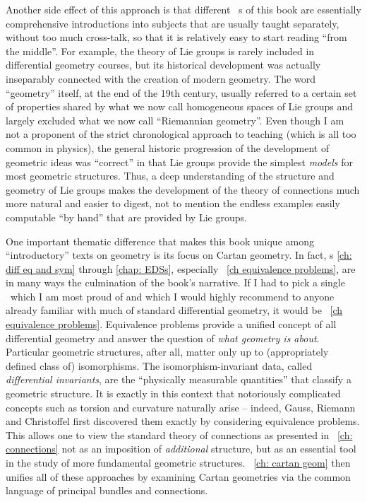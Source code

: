 Another side effect of this approach is that different \chap\ s of this book are essentially comprehensive introductions into subjects that are usually taught separately, without too much cross-talk, so that it is relatively easy to start reading ``from the middle''. For example, the theory of Lie groups is rarely included in differential geometry courses, but its historical development was actually inseparably connected with the creation of modern geometry. The word ``geometry'' itself, at the end of the 19th century, usually referred to a certain set of properties shared by what we now call homogeneous spaces of Lie groups and largely excluded what we now call ``Riemannian geometry''. Even though I am not a proponent of the strict chronological approach to teaching (which is all too common in physics), the general historic progression of the development of geometric ideas was ``correct'' in that Lie groups provide the simplest \emph{models} for most geometric structures. Thus, a deep understanding of the structure and geometry of Lie groups makes the development of the theory of connections much more natural and easier to digest, not to mention the endless examples easily computable ``by hand'' that are provided by Lie groups.

One important thematic difference that makes this book unique among ``introductory'' texts on geometry is its focus on Cartan geometry. In fact, \Chap s \ref{ch: diff eq and sym} through \ref{chap: EDSs}, especially \Chap~\ref{ch equivalence problems}, are in many ways the culmination of the book's narrative. If I had to pick a single \chap\ which I am most proud of and which I would highly recommend to anyone already familiar with much of standard differential geometry, it would be \Chap~\ref{ch equivalence problems}. Equivalence problems provide a unified concept of all differential geometry and answer the question of \emph{what geometry is about}. Particular geometric structures, after all, matter only up to (appropriately defined class of) isomorphisms. The isomorphism-invariant data, called \emph{differential invariants}, are the ``physically measurable quantities'' that classify a geometric structure. It is exactly in this context that notoriously complicated concepts such as torsion and curvature naturally arise -- indeed, Gauss, Riemann and Christoffel first discovered them exactly by considering equivalence problems. This allows one to view the standard theory of connections as presented in \Chap~\ref{ch: connections} not as an imposition of \emph{additional} structure, but as an essential tool in the study of more fundamental geometric structures. \Chap~\ref{ch: cartan geom} then unifies all of these approaches by examining Cartan geometries via the common language of principal bundles and connections.

